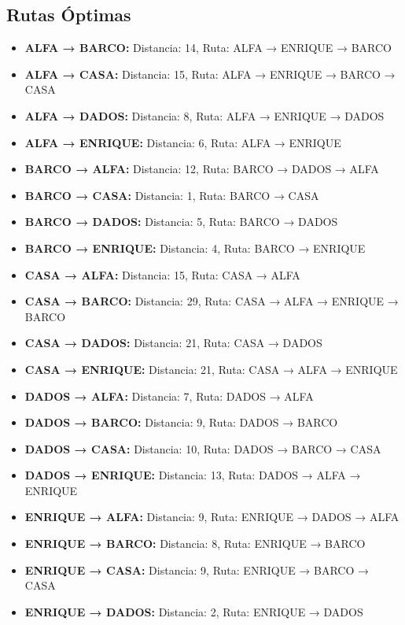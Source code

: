 \documentclass[12pt]{article}
\begin{document}
\subsection{Rutas Óptimas}
\begin{itemize}
\item \textbf{ALFA → BARCO:} Distancia: 14, Ruta: ALFA → ENRIQUE → BARCO
\item \textbf{ALFA → CASA:} Distancia: 15, Ruta: ALFA → ENRIQUE → BARCO → CASA
\item \textbf{ALFA → DADOS:} Distancia: 8, Ruta: ALFA → ENRIQUE → DADOS
\item \textbf{ALFA → ENRIQUE:} Distancia: 6, Ruta: ALFA → ENRIQUE
\item \textbf{BARCO → ALFA:} Distancia: 12, Ruta: BARCO → DADOS → ALFA
\item \textbf{BARCO → CASA:} Distancia: 1, Ruta: BARCO → CASA
\item \textbf{BARCO → DADOS:} Distancia: 5, Ruta: BARCO → DADOS
\item \textbf{BARCO → ENRIQUE:} Distancia: 4, Ruta: BARCO → ENRIQUE
\item \textbf{CASA → ALFA:} Distancia: 15, Ruta: CASA → ALFA
\item \textbf{CASA → BARCO:} Distancia: 29, Ruta: CASA → ALFA → ENRIQUE → BARCO
\item \textbf{CASA → DADOS:} Distancia: 21, Ruta: CASA → DADOS
\item \textbf{CASA → ENRIQUE:} Distancia: 21, Ruta: CASA → ALFA → ENRIQUE
\item \textbf{DADOS → ALFA:} Distancia: 7, Ruta: DADOS → ALFA
\item \textbf{DADOS → BARCO:} Distancia: 9, Ruta: DADOS → BARCO
\item \textbf{DADOS → CASA:} Distancia: 10, Ruta: DADOS → BARCO → CASA
\item \textbf{DADOS → ENRIQUE:} Distancia: 13, Ruta: DADOS → ALFA → ENRIQUE
\item \textbf{ENRIQUE → ALFA:} Distancia: 9, Ruta: ENRIQUE → DADOS → ALFA
\item \textbf{ENRIQUE → BARCO:} Distancia: 8, Ruta: ENRIQUE → BARCO
\item \textbf{ENRIQUE → CASA:} Distancia: 9, Ruta: ENRIQUE → BARCO → CASA
\item \textbf{ENRIQUE → DADOS:} Distancia: 2, Ruta: ENRIQUE → DADOS
\end{itemize}
\end{document}
